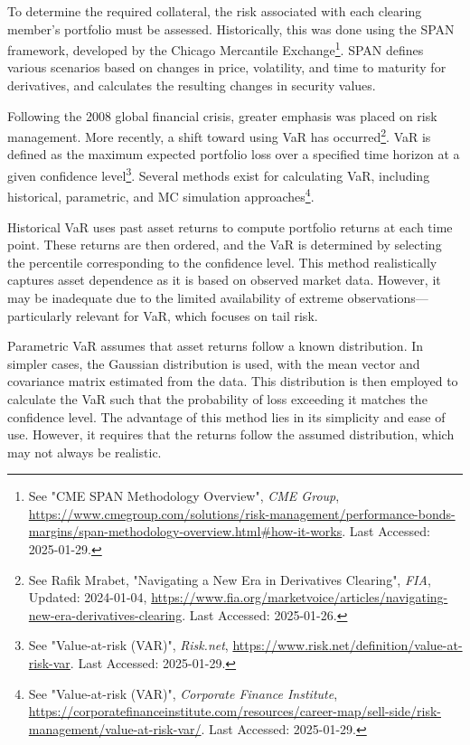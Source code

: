 To determine the required collateral, the risk associated with each clearing member's portfolio must be assessed. Historically, this was done using the \gls{SPAN} framework, developed by the Chicago Mercantile Exchange\footnote{See "CME SPAN Methodology Overview", \textit{CME Group}, \url{https://www.cmegroup.com/solutions/risk-management/performance-bonds-margins/span-methodology-overview.html\#how-it-works}. Last Accessed: 2025-01-29.}. \gls{SPAN} defines various scenarios based on changes in price, volatility, and time to maturity for derivatives, and calculates the resulting changes in security values.

Following the 2008 global financial crisis, greater emphasis was placed on risk management. More recently, a shift toward using \gls{VaR} has occurred\footnote{See Rafik Mrabet, "Navigating a New Era in Derivatives Clearing", \textit{FIA}, Updated: 2024-01-04, \url{https://www.fia.org/marketvoice/articles/navigating-new-era-derivatives-clearing}. Last Accessed: 2025-01-26.}. \gls{VaR} is defined as the maximum expected portfolio loss over a specified time horizon at a given confidence level\footnote{See "Value-at-risk (VAR)", \textit{Risk.net}, \url{https://www.risk.net/definition/value-at-risk-var}. Last Accessed: 2025-01-29.}. Several methods exist for calculating \gls{VaR}, including historical, parametric, and \gls{MC} simulation approaches\footnote{See "Value-at-risk (VAR)", \textit{Corporate Finance Institute}, \url{https://corporatefinanceinstitute.com/resources/career-map/sell-side/risk-management/value-at-risk-var/}. Last Accessed: 2025-01-29.}.  

Historical \gls{VaR} uses past asset returns to compute portfolio returns at each time point. These returns are then ordered, and the \gls{VaR} is determined by selecting the percentile corresponding to the confidence level. This method realistically captures asset dependence as it is based on observed market data\footnotemark[\value{footnote}]. However, it may be inadequate due to the limited availability of extreme observations—particularly relevant for \gls{VaR}, which focuses on tail risk.

Parametric \gls{VaR} assumes that asset returns follow a known distribution. In simpler cases, the Gaussian distribution is used, with the mean vector and covariance matrix estimated from the data. This distribution is then employed to calculate the \gls{VaR} such that the probability of loss exceeding it matches the confidence level\footnotemark[\value{footnote}]. The advantage of this method lies in its simplicity and ease of use. However, it requires that the returns follow the assumed distribution, which may not always be realistic.

